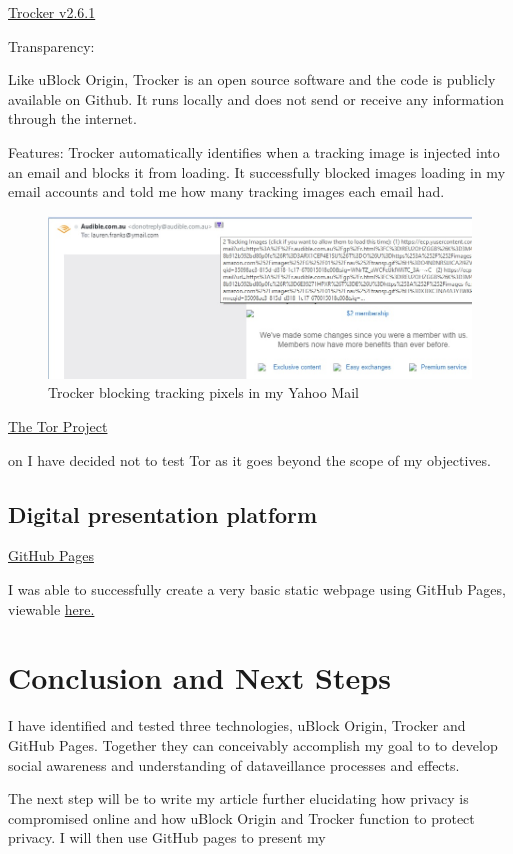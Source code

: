 \documentclass{article}
\begin{document}
\noindent\href{https://trockerapp.github.io/}{Trocker v2.6.1}

\noindent Transparency:

Like uBlock Origin, Trocker is an open source software and the code is publicly available on Github. It runs locally and does not send or receive any information through the internet. \newline

\noindent Features: Trocker automatically identifies when a tracking image is injected into an email and blocks it from loading. It successfully blocked images loading in my email accounts and told me how many tracking images each email had. 

\begin{figure}[htp]
    \centering
    \includegraphics[width=16cm]{trocker ymail block.jpg}
    \caption{Trocker blocking tracking pixels in my Yahoo Mail}
    \label{fig:uBlock Origin dashboard}
\end{figure}


 \newline

\noindent\href{https://www.torproject.org/}{The Tor Project}

on I have decided not to test Tor as it goes beyond the scope of my objectives.

\subsection{Digital presentation platform}
\href{https://pages.github.com/}{GitHub Pages}

I was able to successfully create a very basic static webpage using GitHub Pages, viewable \href{https://laurenfranks11.github.io./}{here.} 

\section{Conclusion and Next Steps}
I have identified and tested three technologies, uBlock Origin, Trocker and GitHub Pages. Together they can conceivably accomplish my goal to to develop social awareness and understanding of dataveillance processes and effects.

The next step will be to write my article further elucidating how privacy is compromised online and how uBlock Origin and Trocker function to protect privacy. I will then use GitHub pages to present my
\end{document}
